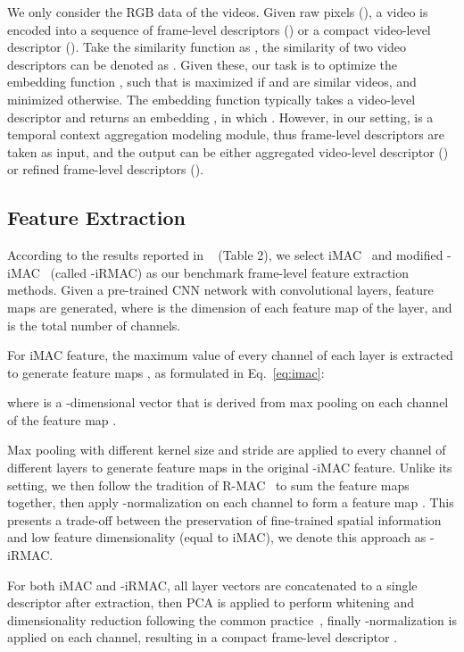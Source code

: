\documentclass[10pt,twocolumn,letterpaper]{article}
\begin{document}
We only consider the RGB data of the videos. Given raw pixels (), a video is encoded into a sequence of frame-level descriptors () or a compact video-level descriptor (). Take the similarity function as , the similarity of two video descriptors  can be denoted as . Given these, our task is to optimize the embedding function , such that  is maximized if  and  are similar videos, and minimized otherwise. The embedding function  typically takes a video-level descriptor  and returns an embedding , in which . However, in our setting,  is a 
temporal context aggregation modeling module, thus frame-level descriptors  are taken as input, and the output can be either aggregated video-level descriptor () or refined frame-level descriptors ().

\subsection{Feature Extraction} \label{subsection:featextract}
According to the results reported in ~\cite{kordopatis2019visil} (Table 2), we select iMAC~\cite{gordo2017end} and modified -iMAC~\cite{kordopatis2019visil} (called -iRMAC) as our benchmark frame-level feature extraction methods. Given a pre-trained CNN network with  convolutional layers,  feature maps  are generated, where
 is the dimension of each feature map of the  layer, and  is the total number of channels. 

For iMAC feature, the maximum value of every channel of each layer is extracted to generate  feature maps , as formulated in Eq.~\ref{eq:imac}:

where  is a -dimensional vector that is derived from max pooling on each channel of the feature map .

Max pooling with different kernel size and stride are applied to every channel of different layers to generate  feature maps  in the original -iMAC feature. Unlike its setting, we then follow the tradition of R-MAC~\cite{tolias2015particular} to sum the  feature maps together, then apply -normalization on each channel to form a feature map . This presents a trade-off between the preservation of fine-trained spatial information and low feature dimensionality (equal to iMAC), we denote this approach as -iRMAC.

For both iMAC and -iRMAC, all layer vectors are concatenated to a single descriptor after extraction, then PCA is applied to perform whitening and dimensionality reduction following the common practice~\cite{jegou2012negative,kordopatis2019visil}, finally -normalization is applied on each channel, resulting in a compact frame-level descriptor .
\end{document}
